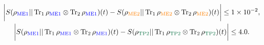 \documentclass{report} %
\numberwithin{equation}{section}
\begin{document}
\begin{gather*}
     \bigg|S(\rho_{\textnormal{\textcolor{blue}{ME1}}}|| \Tr_{1}\rho_{\textnormal{\textcolor{blue}{ME1}}} \otimes \Tr_{2}\rho_{\textnormal{\textcolor{blue}{ME1}}})(t) - S(\rho_{\textnormal{\textcolor{orange}{ME2}}}|| \Tr_{1}\rho_{\textnormal{\textcolor{orange}{ME2}}} \otimes \Tr_{2}\rho_{\textnormal{\textcolor{orange}{ME2}}})(t)  \bigg| \leq 1 \times 10^{-2}, \\ \bigg|S(\rho_{\textnormal{\textcolor{blue}{ME1}}}|| \Tr_{1}\rho_{\textnormal{\textcolor{blue}{ME1}}} \otimes \Tr_{2}\rho_{\textnormal{\textcolor{blue}{ME1}}})(t) -
     S(\rho_{\textnormal{\textcolor{dark green}{TP2}}}|| \Tr_{1}\rho_{\textnormal{\textcolor{dark green}{TP2}}} \otimes \Tr_{2}\rho_{\textnormal{\textcolor{dark green}{TP2}}})(t) \bigg| \leq 4.0.
\end{gather*}
\end{document}
